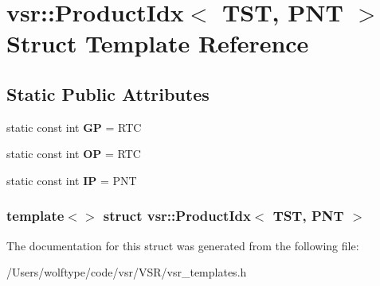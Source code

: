 \hypertarget{structvsr_1_1_product_idx_3_01_t_s_t_00_01_p_n_t_01_4}{\section{vsr\-:\-:Product\-Idx$<$ T\-S\-T, P\-N\-T $>$ Struct Template Reference}
\label{structvsr_1_1_product_idx_3_01_t_s_t_00_01_p_n_t_01_4}
}
\subsection*{Static Public Attributes}
\begin{DoxyCompactItemize}
\item 
\hypertarget{structvsr_1_1_product_idx_3_01_t_s_t_00_01_p_n_t_01_4_ac8e3c25948f4e1483d66fb402d08fd3e}{static const int {\bfseries G\-P} = R\-T\-C}\label{structvsr_1_1_product_idx_3_01_t_s_t_00_01_p_n_t_01_4_ac8e3c25948f4e1483d66fb402d08fd3e}

\item 
\hypertarget{structvsr_1_1_product_idx_3_01_t_s_t_00_01_p_n_t_01_4_af90a4cf8b96573796303750afba13c1d}{static const int {\bfseries O\-P} = R\-T\-C}\label{structvsr_1_1_product_idx_3_01_t_s_t_00_01_p_n_t_01_4_af90a4cf8b96573796303750afba13c1d}

\item 
\hypertarget{structvsr_1_1_product_idx_3_01_t_s_t_00_01_p_n_t_01_4_a2c58b740828819be91c9a1623e2efb61}{static const int {\bfseries I\-P} = P\-N\-T}\label{structvsr_1_1_product_idx_3_01_t_s_t_00_01_p_n_t_01_4_a2c58b740828819be91c9a1623e2efb61}

\end{DoxyCompactItemize}
\subsubsection*{template$<$$>$ struct vsr\-::\-Product\-Idx$<$ T\-S\-T, P\-N\-T $>$}



The documentation for this struct was generated from the following file\-:\begin{DoxyCompactItemize}
\item 
/\-Users/wolftype/code/vsr/\-V\-S\-R/vsr\-\_\-templates.\-h\end{DoxyCompactItemize}
